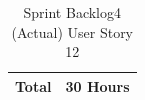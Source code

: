 \documentclass[12pt]{report}
\begin{document}
\begin{table}[h]
{\begin{tabular}{|cc|ccccccccc|}
\multicolumn{2}{|c|}{\textbf{Total}}                                                                                                                                                   & \multicolumn{9}{c|}{30   Hours}                                                                                                                                                                                                                                                                                                                                                                                                                                                                                                                                                                                                                                                                                                                                                                                                                                                                                                                                                                                                              \\ \hline
\end{tabular}
}
\caption{Sprint Backlog4 (Actual) User Story 12}
\label{tab:mytable}
\end{table}
\end{document}
